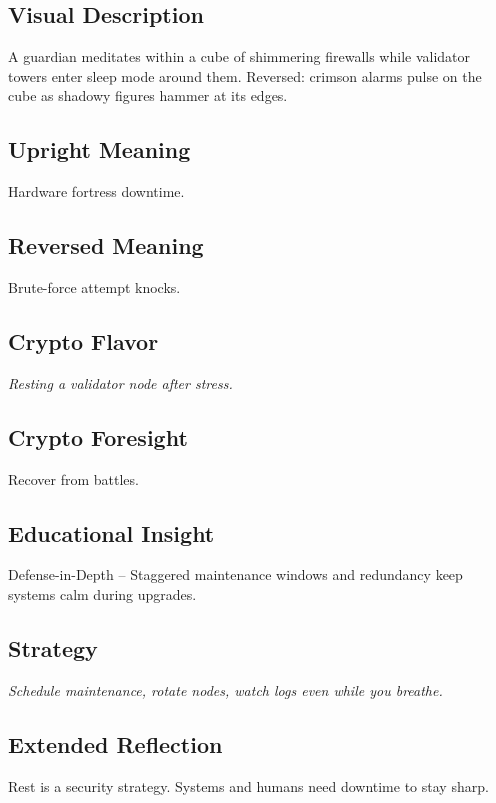 \documentclass[11pt,oneside]{book}
\begin{document}
\begin{minipage}[t]{0.55\textwidth}
  \vspace{0pt}

  \subsection*{Visual Description}
  A guardian meditates within a cube of shimmering firewalls while validator towers enter sleep mode around them. Reversed: crimson alarms pulse on the cube as shadowy figures hammer at its edges.

  \subsection*{Upright Meaning}
  Hardware fortress downtime.

  \subsection*{Reversed Meaning}
  Brute-force attempt knocks.

  \subsection*{Crypto Flavor}
  \textit{Resting a validator node after stress.}

  \subsection*{Crypto Foresight}
  Recover from battles.

  \subsection*{Educational Insight}
  Defense-in-Depth – Staggered maintenance windows and redundancy keep systems calm during upgrades.

  \subsection*{Strategy}
  \textit{Schedule maintenance, rotate nodes, watch logs even while you breathe.}

  \subsection*{Extended Reflection}
  Rest is a security strategy. Systems and humans need downtime to stay sharp.


\end{minipage}
\end{document}
